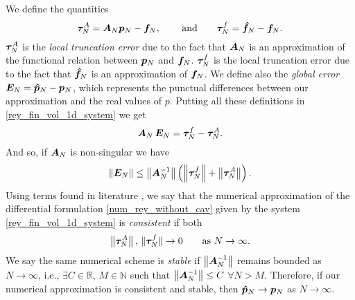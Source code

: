 We define the quantities 
\begin{equation}
\boldsymbol{\tau}^A_N=\boldsymbol{A}_N \boldsymbol{p}_N-\boldsymbol{f}_N,\,\qquad\text{and}\qquad \boldsymbol{\tau}_N^f=\boldsymbol{\hat{f}}_N-\boldsymbol{f}_N.
\end{equation}
$\boldsymbol{\tau}_N^A$ is the \emph{local truncation error} due to the fact that $\boldsymbol{A}_N$ is an approximation of the functional relation between $\boldsymbol{p}_N$ and $\boldsymbol{f}_N$. $\boldsymbol{\tau}_N^f$ is the local truncation error due to the fact that $\boldsymbol{\hat{f}}_N$ is an approximation of $\boldsymbol{f}_N$. We define also the \emph{global error} $\boldsymbol{E}_N=\boldsymbol{\hat{p}}_N-\boldsymbol{p}_N$, which represents the punctual differences between our approximation and the real values of $p$. Putting all these definitions in \eqref{rey_fin_vol_1d_system} we get
\begin{equation*}
\boldsymbol{A}_N\,\boldsymbol{E}_N=\boldsymbol{\tau}_N^f-\boldsymbol{\tau}_N^A.
\end{equation*}
And so, if $\boldsymbol{A}_N$ is non-singular we have
\begin{equation*}
\left\lVert \boldsymbol{E}_N\right\rVert\leq \left\lVert \boldsymbol{A}_N^{-1}\right\rVert
\left(\left\lVert\boldsymbol{\tau}_N^f\right\rVert+
\left\lVert\boldsymbol{\tau}_N^A\right\rVert\right).
\end{equation*}
Using terms found in literature \cite{leveque2007}, we say that the numerical approximation of the differential formulation \eqref*{num_rey_without_cav} given by the system \eqref*{rey_fin_vol_1d_system} is \emph{consistent} if both $$\left\lVert\boldsymbol{\tau}_N^A\right\rVert,\,\|\boldsymbol{\tau}_N^f\|\rightarrow 0 \qquad\text{as } N\rightarrow \infty.$$
We say the same numerical scheme is \emph{stable} if $\left\lVert\boldsymbol{A}_N^{-1}\right\rVert$ remains bounded as $N\rightarrow \infty$, i.e., $\exists C\in \mathbb{R}$, $M\in\mathbb{N}$ such that $\left\lVert\boldsymbol{A}_N^{-1}\right\rVert\leq C$ $\forall N>M$. Therefore, if our numerical approximation is consistent and stable, then $\boldsymbol{\hat{p}}_N\rightarrow\boldsymbol{p}_N$ as $N\rightarrow \infty$.

